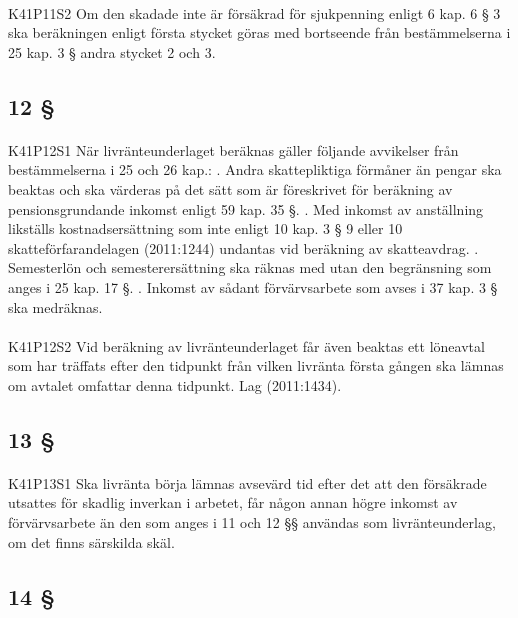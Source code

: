 \documentclass[a4paper,notitlepage,openany,10pt]{book}
\begin{document}
\paragraph*{}
{\tiny K41P11S2}
Om den skadade inte är försäkrad för sjukpenning enligt 6 kap. 6 § 3 ska beräkningen enligt första stycket göras med bortseende från bestämmelserna i 25 kap. 3 § andra stycket 2 och 3.
\subsection*{12 §}
\paragraph*{}
{\tiny K41P12S1}
När livränteunderlaget beräknas gäller följande avvikelser från bestämmelserna i 25 och 26 kap.:
. Andra skattepliktiga förmåner än pengar ska beaktas och ska värderas på det sätt som är föreskrivet för beräkning av pensionsgrundande inkomst enligt 59 kap. 35 §.
. Med inkomst av anställning likställs kostnadsersättning som inte enligt 10 kap. 3 § 9 eller 10 skatteförfarandelagen (2011:1244) undantas vid beräkning av skatteavdrag.
. Semesterlön och semesterersättning ska räknas med utan den begränsning som anges i 25 kap. 17 §.
. Inkomst av sådant förvärvsarbete som avses i 37 kap. 3 § ska medräknas.
\paragraph*{}
{\tiny K41P12S2}
Vid beräkning av livränteunderlaget får även beaktas ett löneavtal som har träffats efter den tidpunkt från vilken livränta första gången ska lämnas om avtalet omfattar denna tidpunkt.
Lag (2011:1434).
\subsection*{13 §}
\paragraph*{}
{\tiny K41P13S1}
Ska livränta börja lämnas avsevärd tid efter det att den försäkrade utsattes för skadlig inverkan i arbetet, får någon annan högre inkomst av förvärvsarbete än den som anges i 11 och 12 §§ användas som livränteunderlag, om det finns särskilda skäl.
\subsection*{14 §}
\end{document}
